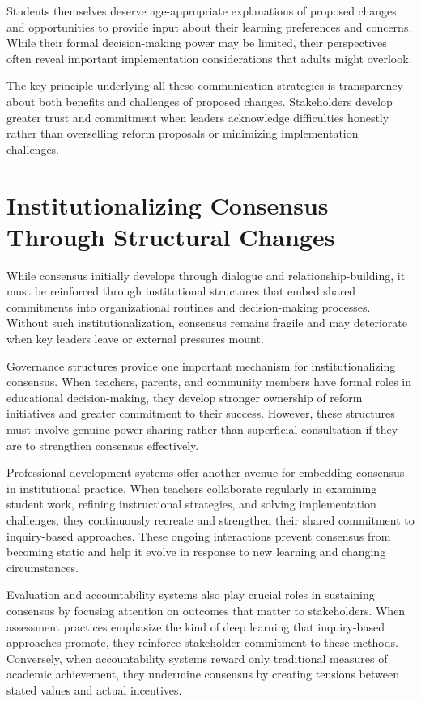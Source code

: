 \documentclass[
  Letterpaper,
]{scrbook}
\begin{document}
Students themselves deserve age-appropriate explanations of proposed
changes and opportunities to provide input about their learning
preferences and concerns. While their formal decision-making power may
be limited, their perspectives often reveal important implementation
considerations that adults might overlook.

The key principle underlying all these communication strategies is
transparency about both benefits and challenges of proposed changes.
Stakeholders develop greater trust and commitment when leaders
acknowledge difficulties honestly rather than overselling reform
proposals or minimizing implementation challenges.

\section{Institutionalizing Consensus Through Structural
Changes}\label{institutionalizing-consensus-through-structural-changes}

While consensus initially develops through dialogue and
relationship-building, it must be reinforced through institutional
structures that embed shared commitments into organizational routines
and decision-making processes. Without such institutionalization,
consensus remains fragile and may deteriorate when key leaders leave or
external pressures mount.

Governance structures provide one important mechanism for
institutionalizing consensus. When teachers, parents, and community
members have formal roles in educational decision-making, they develop
stronger ownership of reform initiatives and greater commitment to their
success. However, these structures must involve genuine power-sharing
rather than superficial consultation if they are to strengthen consensus
effectively.

Professional development systems offer another avenue for embedding
consensus in institutional practice. When teachers collaborate regularly
in examining student work, refining instructional strategies, and
solving implementation challenges, they continuously recreate and
strengthen their shared commitment to inquiry-based approaches. These
ongoing interactions prevent consensus from becoming static and help it
evolve in response to new learning and changing circumstances.

Evaluation and accountability systems also play crucial roles in
sustaining consensus by focusing attention on outcomes that matter to
stakeholders. When assessment practices emphasize the kind of deep
learning that inquiry-based approaches promote, they reinforce
stakeholder commitment to these methods. Conversely, when accountability
systems reward only traditional measures of academic achievement, they
undermine consensus by creating tensions between stated values and
actual incentives.
\end{document}
